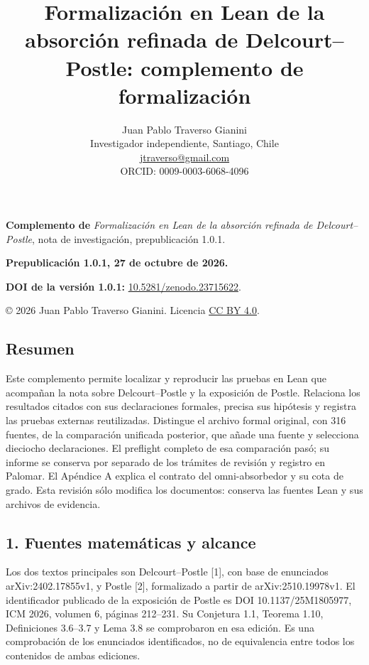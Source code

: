 \documentclass[spanish,11pt,a4paper]{article}
\title{Formalización en Lean de la absorción refinada de Delcourt–Postle: complemento de formalización}
\author{Juan Pablo Traverso Gianini\\
\small Investigador independiente, Santiago, Chile\\
\small \href{mailto:jtraverso@gmail.com}{jtraverso@gmail.com}\\
\small ORCID: 0009-0003-6068-4096}
\date{}
\begin{document}
\raggedbottom
{}
\makeatletter
{}
\makeatother
\maketitle
\textbf{Complemento de} \emph{Formalización en Lean de la absorción refinada de Delcourt--Postle}, nota de investigación, prepublicación 1.0.1.

\textbf{Prepublicación 1.0.1, 27 de octubre de 2026.}

\textbf{DOI de la versión 1.0.1:} \href{https://doi.org/10.5281/zenodo.23715622}{10.5281/zenodo.23715622}.

© 2026 Juan Pablo Traverso Gianini. Licencia \href{https://creativecommons.org/licenses/by/4.0/}{CC BY 4.0}.

\subsection{Resumen}\label{resumen}

Este complemento permite localizar y reproducir las pruebas en Lean que acompañan la nota sobre Delcourt--Postle y la exposición de Postle. Relaciona los resultados citados con sus declaraciones formales, precisa sus hipótesis y registra las pruebas externas reutilizadas. Distingue el archivo formal original, con 316 fuentes, de la comparación unificada posterior, que añade una fuente y selecciona dieciocho declaraciones. El preflight completo de esa comparación pasó; su informe se conserva por separado de los trámites de revisión y registro en Palomar. El Apéndice A explica el contrato del omni-absorbedor y su cota de grado. Esta revisión sólo modifica los documentos: conserva las fuentes Lean y sus archivos de evidencia.

\subsection{1. Fuentes matemáticas y alcance}\label{fuentes-matemuxe1ticas-y-alcance}

Los dos textos principales son Delcourt--Postle {[}1{]}, con base de enunciados arXiv:2402.17855v1, y Postle {[}2{]}, formalizado a partir de arXiv:2510.19978v1. El identificador publicado de la exposición de Postle es DOI 10.1137/25M1805977, ICM 2026, volumen 6, páginas 212--231. Su Conjetura 1.1, Teorema 1.10, Definiciones 3.6--3.7 y Lema 3.8 se comprobaron en esa edición. Es una comprobación de los enunciados identificados, no de equivalencia entre todos los contenidos de ambas ediciones.
\end{document}
